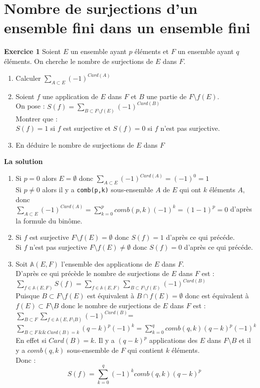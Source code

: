 \documentclass[a4paper,11pt]{book}
\begin{document}
\section{Nombre de surjections d'un ensemble fini dans un ensemble fini}
{\bf Exercice 1}
Soient $E$ un ensemble ayant $p$ \'el\'ements et $F$ un ensemble ayant $q$ 
\'el\'ements. On cherche le nombre de surjections de $E$ dans $F$.
\begin{enumerate}
\item Calculer $\sum_{A\subset E}(-1)^{Card(A)}$
\item Soient $f$ une application de $E$ dans $F$ et $B$ une partie de 
$F\setminus f(E)$.\\
On pose : $S(f)=\sum_{B\subset F\setminus f(E)}(-1)^{Card(B)}$\\
Montrer que :\\
$S(f)=1$ si $f$ est surjective et $S(f)=0$ si $f$ n'est pas surjective. 
\item En d\'eduire le nombre de surjections de $E$ dans $F$
\end{enumerate}
{\bf La solution}
\begin{enumerate}
\item Si $p=0$ alors $E=\emptyset$ donc $\sum_{A\subset E}(-1)^{Card(A)}=(-1)^0=1$\\
Si $p\neq 0$ alors il y a {\tt comb(p,k)} sous-ensemble $A$ de $E$ qui ont $k$ 
\'el\'ements $A$, 
donc \\
$\sum_{A\subset E}(-1)^{Card(A)}=\sum_{k=0}^pcomb(p,k)(-1)^{k}=(1-1)^p=0$ d'apr\`es
 la formule du bin\^ome.
\item Si $f$ est surjective $F\setminus f(E)=\emptyset$ donc $S(f)=1$ d'apr\`es ce
qui pr\'ec\'ede.\\
Si $f$ n'est pas surjective $F\setminus f(E)\neq \emptyset$ donc  $S(f)=0$ 
d'apr\`es ce qui pr\'ec\'ede.\\
\item Soit $\mathbb A(E,F)$ l'ensemble des applications de $E$ dans $F$.\\
D'apr\`es ce qui pr\'ec\`ede le nombre de surjections de $E$ dans $F$ 
est :\\
$\sum_{f\in \mathbb A(E,F)}S(f)=\sum_{f\in \mathbb A(E,F)}\sum_{B\subset F\setminus f(E)}(-1)^{Card(B)}$\\
Puisque $B\subset F\setminus f(E)$ est \'equivalent \`a 
$B\cap f(E)=\emptyset$ donc est \'equivalent \`a $f(E)\subset F\setminus B$ 
donc le nombre de surjections de $E$ dans $F$ est :\\
$\sum_{B\subset F}\sum_{f\in\mathbb A(E,F\setminus B)} (-1)^{Card(B)}$=\\
$\sum_{B\subset F\ \&\& \  Card(B)=k}(q-k)^p(-1)^{k}=\sum_{k=0}^q comb(q,k)(q-k)^p(-1)^{k}$\\
En effet si  $Card(B)=k$. Il y a $(q-k)^p$ applications des $E$ dans $F\setminus B$ et il y a $comb(q,k)$ sous-ensemble de $F$ qui contient $k$ \'el\'ements.\\
 Donc :
$$S(f)=\sum_{k=0}^q(-1)^kcomb(q,k)(q-k)^p$$
\end{enumerate}
\end{document}

